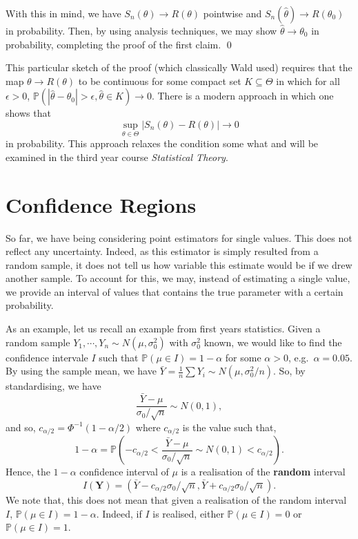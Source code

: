 \documentclass[
]{article}
\theoremstyle{definition}
\theoremstyle{definition}
\begin{document}
With this in mind, we have \(S_n(\theta) \to R(\theta)\) pointwise and
\(S_n(\hat{\theta}) \to R(\theta_0)\) in probability. Then, by using
analysis techniques, we may show \(\hat{\theta} \to \theta_0\) in
probability, completing the proof of the first claim. \qed

This particular sketch of the proof (which classically Wald used)
requires that the map \(\theta \to R(\theta)\) to be continuous for some
compact set \(K \subseteq \Theta\) in which for all \(\epsilon > 0\),
\(\mathbb{P}(|\hat{\theta} - \theta_0| > \epsilon, \hat{\theta} \in K) \to 0\).
There is a modern approach in which one shows that
\[\sup_{\theta \in \Theta} |S_n(\theta) - R(\theta)| \to 0\] in
probability. This approach relaxes the condition some what and will be
examined in the third year course \emph{Statistical Theory}.

\newpage

\hypertarget{confidence-regions}{%
\section{Confidence Regions}\label{confidence-regions}}

So far, we have being considering point estimators for single values.
This does not reflect any uncertainty. Indeed, as this estimator is
simply resulted from a random sample, it does not tell us how variable
this estimate would be if we drew another sample. To account for this,
we may, instead of estimating a single value, we provide an interval of
values that contains the true parameter with a certain probability.

As an example, let us recall an example from first years statistics.
Given a random sample \(Y_1, \cdots, Y_n \sim N(\mu, \sigma_0^2)\) with
\(\sigma^2_0\) known, we would like to find the confidence intervale
\(I\) such that \(\mathbb{P}(\mu \in I) = 1 - \alpha\) for some
\(\alpha > 0\), e.g.~\(\alpha = 0.05\). By using the sample mean, we
have \(\bar{Y} = \frac{1}{n} \sum Y_i \sim N(\mu, \sigma_0^2 / n)\). So,
by standardising, we have
\[\frac{\bar{Y} - \mu}{\sigma_0 / \sqrt{n}} \sim N(0, 1),\] and so,
\(c_{\alpha / 2} = \Phi^{-1}(1 - \alpha / 2)\) where \(c_{\alpha / 2}\)
is the value such that,
\[1 - \alpha =  \mathbb{P}\left(- c_{\alpha / 2} < 
  \frac{\bar{Y} - \mu}{\sigma_0 / \sqrt{n}} \sim N(0, 1) < c_{\alpha / 2} \right).\]
Hence, the \(1 - \alpha\) confidence interval of \(\mu\) is a
realisation of the \textbf{random} interval
\[I(\mathbf{Y}) = (\bar{Y} - c_{\alpha / 2} \sigma_0 / \sqrt{n}, 
  \bar{Y} + c_{\alpha / 2} \sigma_0 / \sqrt{n}).\] We note that, this
does not mean that given a realisation of the random interval \(I\),
\(\mathbb{P}(\mu \in I) = 1 - \alpha\). Indeed, if \(I\) is realised,
either \(\mathbb{P}(\mu \in I) = 0\) or \(\mathbb{P}(\mu \in I) = 1\).
\end{document}
